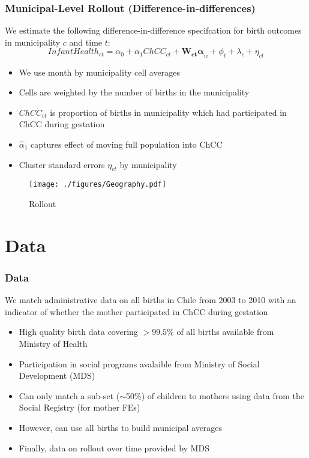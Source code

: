 \documentclass[10pt,letterpaper,subeqn]{beamer}
\begin{document}
\begin{frame}
\frametitle{Municipal-Level Rollout (Difference-in-differences)}
We estimate the following difference-in-difference specifcation for birth outcomes in municipality $c$ and time $t$:  \vspace{3mm}
\begin{equation}
  \label{eqn:DD}
  Infant Health_{ct} = \alpha_0 + \alpha_1 ChCC_{ct} + \bm{W_{ct}\alpha}_{w} + \phi_t + \lambda_c + \eta_{ct}
\end{equation}
\vspace{3mm}
\begin{itemize}
\item We use month by municipality cell averages
\item Cells are weighted by the number of births in the municipality
\item $ChCC_{ct}$ is proportion of births in municipality which had participated in ChCC during gestation
\item $\widehat\alpha_1$ captures effect of moving full population into ChCC
\item Cluster standard errors $\eta_{ct}$ by municipality
\end{itemize}

\end{frame}

\begin{frame}
\begin{figure}[htpb!]
  \begin{center}
  \centering
  \caption{Rollout}
  \texttt{[image: ./figures/Geography.pdf]}
  \label{fig:ChCCcover}
\end{center}
\end{figure}
\end{frame}

\section{Data}
\begin{frame}
\frametitle{Data}
We match administrative data on all births in Chile from 2003 to 2010 with an indicator of whether the mother participated in ChCC during gestation \vspace{3mm}
\begin{itemize}
\item High quality birth data covering $>99.5\%$ of all births available from Ministry of Health
\item Participation in social programs avalaible from Ministry of Social Development (MDS)
\item Can only match a sub-set ($\sim$50\%) of children to mothers using data from the Social Registry (for mother FEs)
\item However, can use all births to build municipal averages
\item Finally, data on rollout over time provided by MDS
\end{itemize}
\end{frame}
\end{document}
